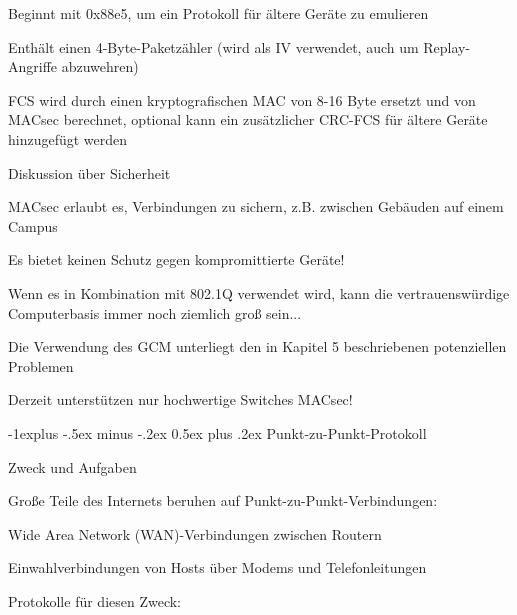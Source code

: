 \documentclass[a4paper]{article}
\makeatletter
\renewcommand{\subsection}{\@startsection{subsection}{2}{0mm}%
 {-1explus -.5ex minus -.2ex}%
 {0.5ex plus .2ex}%
 {\normalfont\normalsize\bfseries}}
\makeatother
\begin{document}
\begin{multicols}{3}
\begin{itemize*}
            \begin{itemize*}
                  \item Beginnt mit 0x88e5, um ein Protokoll für ältere Geräte zu emulieren
                  \item Enthält einen 4-Byte-Paketzähler (wird als IV verwendet, auch um Replay-Angriffe abzuwehren)
            \end{itemize*}
            \item
            FCS wird durch einen kryptografischen MAC von 8-16 Byte ersetzt und
            von MACsec berechnet, optional kann ein zusätzlicher CRC-FCS für
            ältere Geräte hinzugefügt werden
      \end{itemize*}

      Diskussion über Sicherheit

      \begin{itemize*}
            \item
            MACsec erlaubt es, Verbindungen zu sichern, z.B. zwischen Gebäuden auf
            einem Campus
            \item
            Es bietet keinen Schutz gegen kompromittierte Geräte!

            \begin{itemize*}
                  \item Wenn es in Kombination mit 802.1Q verwendet wird, kann die vertrauenswürdige Computerbasis immer noch ziemlich groß sein...
                  \item Die Verwendung des GCM unterliegt den in Kapitel 5 beschriebenen potenziellen Problemen
                  \item Derzeit unterstützen nur hochwertige Switches MACsec!
            \end{itemize*}
      \end{itemize*}


      \subsection{Punkt-zu-Punkt-Protokoll}

      Zweck und Aufgaben

      \begin{itemize*}
            \item
            Große Teile des Internets beruhen auf Punkt-zu-Punkt-Verbindungen:

            \begin{itemize*}
                  \item Wide Area Network (WAN)-Verbindungen zwischen Routern
                  \item Einwahlverbindungen von Hosts über Modems und Telefonleitungen
            \end{itemize*}
            \item
            Protokolle für diesen Zweck:


\end{itemize*}
\end{multicols}
\end{document}
